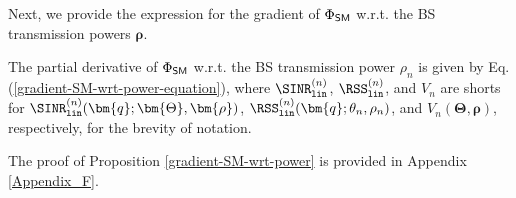 Next, we provide the expression for the gradient of $\Phi_{{\sf SM}}$ w.r.t. the BS transmission powers $\bm{\rho}$.

\begin{Proposition}\label{gradient-SM-wrt-power}
    The partial derivative of $\Phi_{{\sf SM}}$ w.r.t. the BS transmission power $\rho_n$ is given by Eq. (\ref{gradient-SM-wrt-power-equation}),
where $\SINR^{(n)}_{\mathtt{lin}} $, $\RSS^{(n)}_{\mathtt{lin}}$, and $V_n$ are shorts for $\SINR^{(n)}_{\mathtt{lin}}(\bm{q}; \bm{\Theta}, \bm{\rho})$, $\RSS^{(n)}_{\mathtt{lin}}(\bm{q}; \theta_n, \rho_n)$, and $V_n(\bm{\Theta}, \bm{\rho})$, respectively, for the brevity of notation.
\end{Proposition}
The proof of Proposition \ref{gradient-SM-wrt-power} is provided in Appendix \ref{Appendix_F}.



